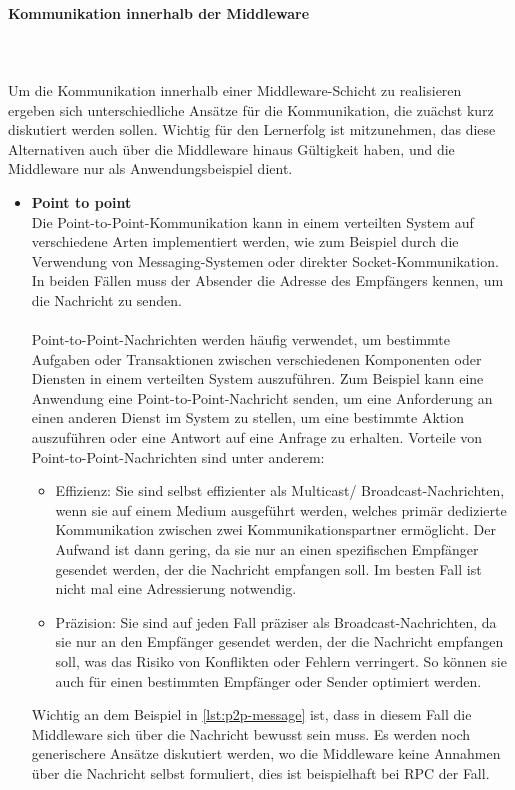 \documentclass[../vs-script-first-v01.tex]{subfiles}
\begin{document}
\paragraph{Kommunikation innerhalb der  Middleware}\mbox{}\\\\
Um die Kommunikation innerhalb einer Middleware-Schicht zu realisieren ergeben sich unterschiedliche Ansätze für die Kommunikation, die zuächst kurz diskutiert werden sollen. Wichtig für den Lernerfolg ist mitzunehmen, das diese Alternativen auch über die Middleware hinaus Gültigkeit haben, und die Middleware nur als Anwendungsbeispiel dient.  
\begin{itemize}
\item \textbf{Point to point}\\
Die Point-to-Point-Kommunikation kann in einem verteilten System auf verschiedene Arten implementiert werden, wie zum Beispiel durch die Verwendung von Messaging-Systemen oder direkter Socket-Kommunikation. In beiden Fällen muss der Absender die Adresse des Empfängers kennen, um die Nachricht zu senden.
\\\\
Point-to-Point-Nachrichten werden häufig verwendet, um bestimmte Aufgaben oder Transaktionen zwischen verschiedenen Komponenten oder Diensten in einem verteilten System auszuführen. Zum Beispiel kann eine Anwendung eine Point-to-Point-Nachricht senden, um eine Anforderung an einen anderen Dienst im System zu stellen, um eine bestimmte Aktion auszuführen oder eine Antwort auf eine Anfrage zu erhalten. Vorteile von Point-to-Point-Nachrichten sind unter anderem:
\begin{itemize}
\item Effizienz: Sie sind selbst effizienter als Multicast/ Broadcast-Nachrichten, wenn sie auf einem Medium ausgeführt werden, welches primär dedizierte Kommunikation zwischen zwei Kommunikationspartner ermöglicht. Der Aufwand ist dann gering, da sie nur an einen spezifischen Empfänger gesendet werden, der die Nachricht empfangen soll. Im besten Fall ist nicht mal eine Adressierung notwendig. 
\item Präzision: Sie sind auf jeden Fall präziser als Broadcast-Nachrichten, da sie nur an den Empfänger gesendet werden, der die Nachricht empfangen soll, was das Risiko von Konflikten oder Fehlern verringert. So können sie auch für einen bestimmten Empfänger oder Sender optimiert werden.
\end{itemize} 
Wichtig an dem Beispiel in \ref{lst:p2p-message} ist, dass in diesem Fall die Middleware sich über die Nachricht bewusst sein muss. Es werden noch generischere Ansätze diskutiert werden, wo die Middleware keine Annahmen über die Nachricht selbst formuliert, dies ist beispielhaft bei RPC der Fall. 


\end{itemize}
\end{document}

